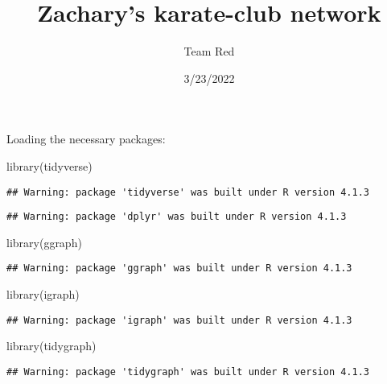 \documentclass[
]{article}
\title{Zachary's karate-club network}
\author{Team Red}
\date{3/23/2022}
\newenvironment{Shaded}{\begin{snugshade}}{\end{snugshade}}
\newcommand{\FunctionTok}[1]{\textcolor[rgb]{0.00,0.00,0.00}{#1}}
\newcommand{\NormalTok}[1]{#1}
\begin{document}
\maketitle

Loading the necessary packages:

\begin{Shaded}
\begin{Highlighting}[]
\FunctionTok{library}\NormalTok{(tidyverse)}
\end{Highlighting}
\end{Shaded}

\begin{verbatim}
## Warning: package 'tidyverse' was built under R version 4.1.3
\end{verbatim}

\begin{verbatim}
## Warning: package 'dplyr' was built under R version 4.1.3
\end{verbatim}

\begin{Shaded}
\begin{Highlighting}[]
\FunctionTok{library}\NormalTok{(ggraph)}
\end{Highlighting}
\end{Shaded}

\begin{verbatim}
## Warning: package 'ggraph' was built under R version 4.1.3
\end{verbatim}

\begin{Shaded}
\begin{Highlighting}[]
\FunctionTok{library}\NormalTok{(igraph)}
\end{Highlighting}
\end{Shaded}

\begin{verbatim}
## Warning: package 'igraph' was built under R version 4.1.3
\end{verbatim}

\begin{Shaded}
\begin{Highlighting}[]
\FunctionTok{library}\NormalTok{(tidygraph)}
\end{Highlighting}
\end{Shaded}

\begin{verbatim}
## Warning: package 'tidygraph' was built under R version 4.1.3
\end{verbatim}
\end{document}
